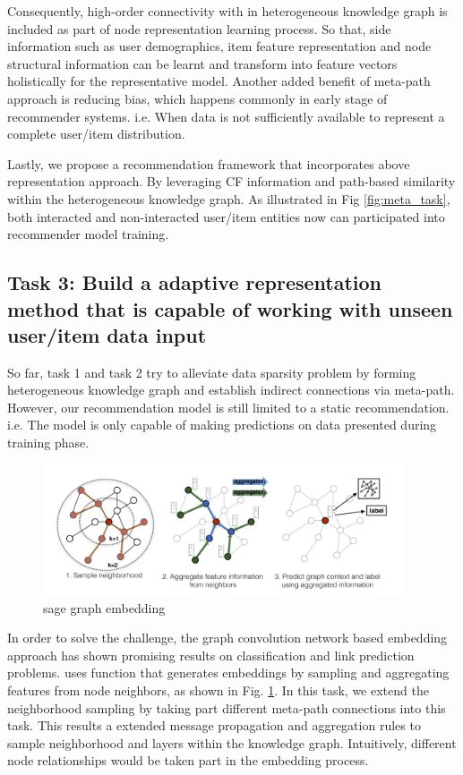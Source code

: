 Consequently, high-order connectivity with in heterogeneous knowledge graph is included as part of node representation learning process. So that, side information such as user demographics, item feature representation and node structural information can be learnt and transform into feature vectors holistically for the representative model.
Another added benefit of meta-path approach is reducing bias, which happens commonly in early stage of recommender systems. i.e. When data is not sufficiently available to represent a complete user/item distribution.

Lastly, we propose a recommendation framework that incorporates above representation approach. By leveraging CF information and path-based similarity within the heterogeneous knowledge graph. As illustrated in Fig \ref{fig:meta_task}, both interacted and non-interacted user/item entities now can participated into recommender model training.

\subsection*{Task 3: Build a adaptive representation method that is capable of working with unseen user/item data input}

So far, task 1 and task 2 try to alleviate data sparsity problem by forming heterogeneous knowledge graph and establish indirect connections via meta-path. However, our recommendation model is still limited to a static recommendation. i.e. The model is only capable of making predictions on data presented during training phase.

\begin{figure}[!ht]
    \centering
    \includegraphics[width=0.95\textwidth]{figs/sagegraph.png}
    \caption{sage graph embedding}\label{fig:sagegraph}
\end{figure}

In order to solve the challenge, the graph convolution network based embedding approach has shown promising results on classification and link prediction problems. \citet{hamilton2017inductive} uses function that generates embeddings by sampling and aggregating features from node neighbors, as shown in Fig. \ref{fig:sagegraph}. In this task, we extend the neighborhood sampling by taking part different meta-path connections into this task. This results a extended message propagation and aggregation rules to sample neighborhood and layers within the knowledge graph. Intuitively, different node relationships would be taken part in the embedding process.

